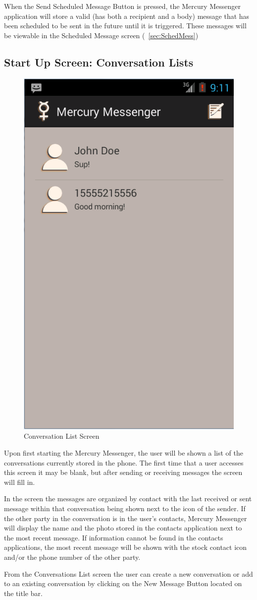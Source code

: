 \documentclass{article}
\begin{document}
\par When the Send Scheduled Message Button is pressed, the Mercury Messenger application will store a valid (has both a recipient and a body) message that has been scheduled to be sent in the future until it is triggered. These messages will be viewable in the Scheduled Message screen (~\ref{sec:SchedMess})


\subsection{Start Up Screen: Conversation Lists}
\label{sec:ConvoList}
\begin{figure}[h!]
\centering
\includegraphics[width=.25\textwidth]{"./Screen_shots/Main_Screen"}{}
\caption{Conversation List Screen}

\end{figure}



\par Upon first starting the Mercury Messenger, the user will be shown a list of the conversations currently stored in the phone. The first time that a user accesses this screen it may be blank, but after sending or receiving messages the screen will fill in.

\par In the screen the messages are organized by contact with the last received or sent message within that conversation being shown next to the icon of the sender. If the other party in the conversation is in the user's contacts, Mercury Messenger will display the name and the photo stored in the contacts application next to the most recent message.
If information cannot be found in the contacts applications, the most recent message will be shown with the stock contact icon and/or the phone number of the other party.

\par From the Conversations List screen the user can create a new conversation or add to an existing conversation by clicking on the New Message Button located on the title bar. 
\end{document}
